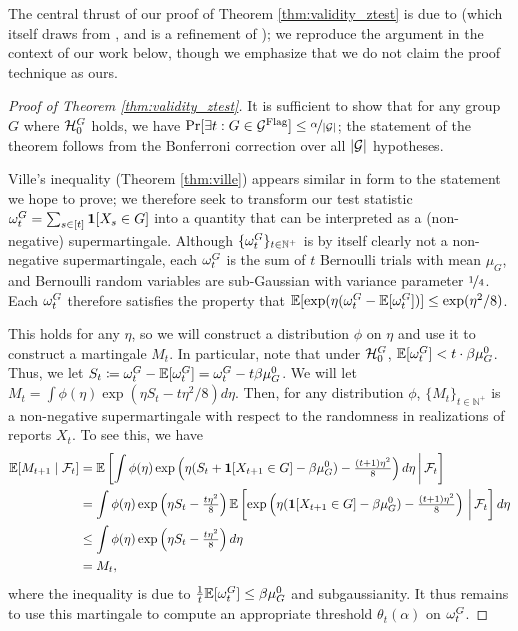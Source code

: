The central thrust of our proof of Theorem \ref{thm:validity_ztest} is due to \citet{koolen2017quick} (which itself draws from \citet{balsubramani2014sharp}, and is a refinement of \citet{jamieson2014lil}); we reproduce the argument in the context of our work below, though we emphasize that we do not claim the proof technique as ours.
\begin{proof}[Proof of Theorem \ref{thm:validity_ztest}]
It is sufficient to show that for any group $G$ where ${\mathcal{H}_0^G}$ holds, we have $\Pr[ \exists t: G \in{\mathcal {G}^{\text{Flag}}}] \leq \nicefrac{\alpha}{|{\mathcal{G}}|}$; the statement of the theorem follows from the Bonferroni correction over all $|{\mathcal{G}}|$ hypotheses. 

Ville's inequality (Theorem \ref{thm:ville}) appears similar in form to the statement we hope to prove; we therefore seek to transform our test statistic $\omega_t^G = \sum_{s \in [t]}\mathbf{1}[X_s \in G]$ into a quantity that can be interpreted as a (non-negative) supermartingale. Although $\{\omega_t^G\}_{t \in \mathbb{N}^+}$ is by itself clearly not a non-negative supermartingale, each $\omega_t^G$ is the sum of $t$ Bernoulli trials with mean $\mu_G$, and Bernoulli random variables are sub-Gaussian with variance parameter $\nicefrac14$. Each $\omega_t^G$ therefore satisfies the property that $\mathbb{E}[\exp(\eta(\omega_t^G - \mathbb{E}[\omega_t^G])] \leq \exp(\eta^2/8)$. 

This holds for any $\eta$, so we will construct a distribution $\phi$ on $\eta$ and use it to construct a martingale $M_t$. In particular, note that under ${\mathcal{H}_0^G}$, $\mathbb{E}[\omega_t^G] < t \cdot \beta{\mu_G^0}$. Thus, we 
let $S_t \coloneqq \omega_t^G - \mathbb{E}[\omega_t^G] =  \omega_t^G - t \beta{\mu_G^0}$. 
We will let 
$M_t = \int \phi(\eta) \exp(\eta S_t - t\eta^2/8) d\eta$.
Then, for any distribution $\phi$, $\{M_t\}_{t \in \mathbb{N}^+}$ is a non-negative supermartingale with respect to the randomness in realizations of reports $X_t$.
To see this, we have 
\begin{align*}
    \mathbb{E}[M_{t+1} \mid \mathcal{F}_t] &= \mathbb{E}\left[\int \phi(\eta)\exp\left(\eta(S_t + \mathbf{1}[X_{t+1} \in G] - \beta{\mu_G^0}) - \tfrac{(t+1)\eta^2}{8}\right) d\eta \, \bigg| \, \mathcal{F}_t\right]
    \\&= \int \phi(\eta) \exp\left(\eta S_t - \tfrac{t\eta^2}{8}\right) \mathbb{E}\left[\exp\left(\eta(\mathbf{1}[X_{t+1} \in G] - \beta{\mu_G^0}) - \tfrac{(t+1)\eta^2}{8}\right) \, \bigg| \, \mathcal{F}_t\right] d\eta 
    \\&\leq \int \phi(\eta) \exp\left(\eta S_t - \tfrac{t\eta^2}{8}\right) d\eta 
    \\&= M_t,
\end{align*}
where the inequality is due to $\frac1t\mathbb{E}[\omega_t^G] \leq \beta{\mu_G^0}$ and subgaussianity. It thus remains to use this martingale to compute an appropriate threshold $\theta_t(\alpha)$ on $\omega_t^G$. 


\end{proof}

